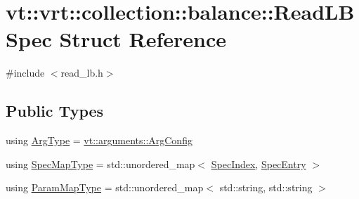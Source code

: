 \hypertarget{structvt_1_1vrt_1_1collection_1_1balance_1_1_read_l_b_spec}{}\section{vt\+:\+:vrt\+:\+:collection\+:\+:balance\+:\+:Read\+L\+B\+Spec Struct Reference}
\label{structvt_1_1vrt_1_1collection_1_1balance_1_1_read_l_b_spec}


{\ttfamily \#include $<$read\+\_\+lb.\+h$>$}

\subsection*{Public Types}
\begin{DoxyCompactItemize}
\item 
using \hyperlink{structvt_1_1vrt_1_1collection_1_1balance_1_1_read_l_b_spec_ae6a9d2b206e9d005310031e2aa42767c}{Arg\+Type} = \hyperlink{structvt_1_1arguments_1_1_arg_config}{vt\+::arguments\+::\+Arg\+Config}
\item 
using \hyperlink{structvt_1_1vrt_1_1collection_1_1balance_1_1_read_l_b_spec_a6b1c83bd61c581d9605941e2381432b9}{Spec\+Map\+Type} = std\+::unordered\+\_\+map$<$ \hyperlink{namespacevt_1_1vrt_1_1collection_1_1balance_a72a5e0d9936ddf57f8e6c64e0e9fd123}{Spec\+Index}, \hyperlink{structvt_1_1vrt_1_1collection_1_1balance_1_1_spec_entry}{Spec\+Entry} $>$
\item 
using \hyperlink{structvt_1_1vrt_1_1collection_1_1balance_1_1_read_l_b_spec_a01c2aa3a9e92be646c37f24afda6afa2}{Param\+Map\+Type} = std\+::unordered\+\_\+map$<$ std\+::string, std\+::string $>$
\end{DoxyCompactItemize}
